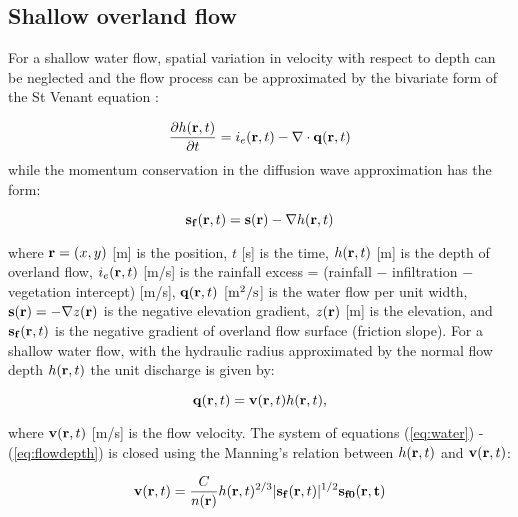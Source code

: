 \documentclass[fleqn,12pt,twoside]{article}
\begin{document}
\subsection{Shallow overland flow}

For a shallow water flow, spatial variation in velocity with respect to depth
can be neglected and the flow process can be approximated by
the bivariate form of the St Venant equation \cite{casc2d95}:  

\begin{equation}
\label{eq:water}
{\partial h({\bf r},t) \over \partial t} =
 i_e({\bf r},t) - \nabla \cdot {\bf q}({\bf r},t)
\end{equation}
while the momentum conservation in the diffusion wave approximation
has the form:

\begin{equation}
\label{eq:momentum}
{\bf s_f}({\bf r},t)={\bf s}({\bf r})-\nabla h({\bf r},t)
\end{equation}

\noindent
where 
${\bf r}=(x,y)$ [m] is the position, 
$t$ [s] is the time,
$h({\bf r},t)$ [m] is the depth of overland flow,
$i_e({\bf r},t)$ [m/s] is the rainfall excess = 
(rainfall $-$ infiltration $-$ vegetation intercept) [m/s],
${\bf q}({\bf r},t)$ [$\rm m^2/s$] is the water flow per unit width,
${\bf s}({\bf r})= - \nabla z({\bf r})$ is the negative elevation gradient,
$z({\bf r})$ [m] is the elevation,
and ${\bf s_f}({\bf r},t)$ is the negative gradient of
overland flow surface (friction slope).
For a shallow water flow, with the hydraulic radius approximated
by the normal flow depth $h({\bf r},t)$ \cite{moorefoster90}
the unit discharge is given by:

\begin{equation}
\label{eq:flowdepth}
{\bf q}({\bf r},t)={\bf v}({\bf r},t) h({\bf r},t),
\end{equation}

\noindent
where ${\bf v}({\bf r},t)$  [m/s] is the flow velocity.
The system of equations (\ref{eq:water}) - (\ref{eq:flowdepth}) is closed
using the Manning's relation between $h({\bf r},t)$ and
 ${\bf v}({\bf r},t)$:

\begin{equation}
\label{eq:man}
{\bf v}({\bf r},t)=
{C\over n({\bf r})} h({\bf r},t)^{2/3}
|{\bf s_f}({\bf r},t)|^{1/2} {\bf s_{f0}({\bf r},t)}
\end{equation}
\end{document}
